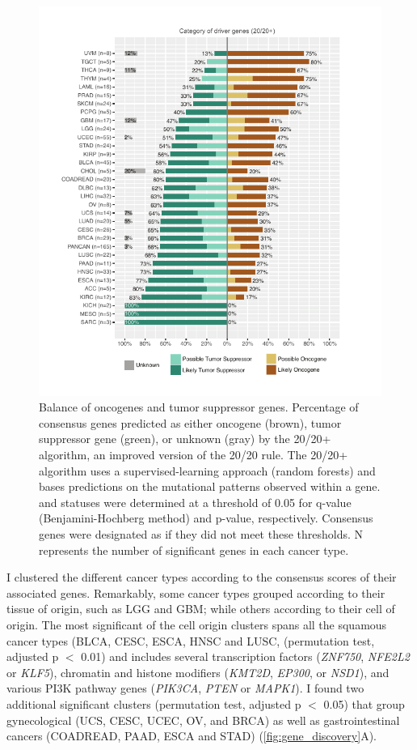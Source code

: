 \begin{figure}
  \centering
  \makeatletter
  \let\@currsize\normalsize
  \includegraphics[width=0.9\linewidth]{figures/chapter7/og_tsg_balance.pdf}
  \caption[Balance of oncogenes and tumor suppressor genes.]{Balance of oncogenes and tumor suppressor genes. Percentage of consensus genes predicted as either oncogene (brown), tumor suppressor gene (green), or unknown (gray) by the 20/20+ algorithm, an improved version of the 20/20 rule. The 20/20+ algorithm uses a supervised-learning approach (random forests) and bases predictions on the mutational patterns observed within a gene.  and  statuses were determined at a threshold of 0.05 for q-value (Benjamini-Hochberg method) and p-value, respectively. Consensus genes were designated as  if they did not meet these thresholds. N represents the number of significant genes in each cancer type.}
  \label{fig:og_tsg_balance}
\end{figure}

I clustered the different cancer types according to the consensus scores of their associated genes. Remarkably, some cancer types grouped according to their tissue of origin, such as LGG and GBM; while others according to their cell of origin. The most significant of the cell origin clusters spans all the squamous cancer types (BLCA, CESC, ESCA, HNSC and LUSC, (permutation test, adjusted p $<$ 0.01) and includes several transcription factors (\textit{ZNF750}, \textit{NFE2L2} or \textit{KLF5}), chromatin and histone modifiers (\textit{KMT2D}, \textit{EP300}, or \textit{NSD1}), and various PI3K pathway genes (\textit{PIK3CA}, \textit{PTEN} or \textit{MAPK1}). I found two additional significant clusters (permutation test, adjusted p $<$ 0.05) that group gynecological (UCS, CESC, UCEC, OV, and BRCA) as well as gastrointestinal cancers (COADREAD, PAAD, ESCA and STAD) (\autoref{fig:gene_discovery}A). 

